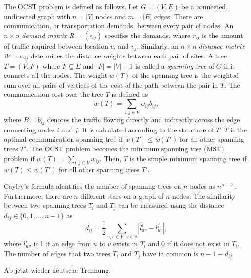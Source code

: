 The OCST problem is defined as follows. Let $G=(V,E)$ be a connected, undirected graph with $n=|V|$ nodes and $m=|E|$ edges. There are  communication, or transportation demands, between every pair of nodes.  An $n \times n$ {\em demand matrix} $R=(r_{ij})$ specifies the demands, where $r_{ij}$ is the amount of traffic required between location $v_i$ and $v_j$. Similarly, an $n\times n$ {\em distance matrix} $W=w_{ij}$ determines the distance weights between each pair of sites. 
A tree $T=(V,F)$ where $F \subseteq E$ and $|F|=|V|-1$ is called a {\em spanning tree} of $G$ if it connects all the nodes. The weight $w(T)$ of the spanning tree is the weighted sum over all pairs of vertices of the cost of the path between the pair in $T$. The communication cost over the tree $T$ is defined as 
\begin{equation}
  \label{equ:1}
w(T)=\sum_{i,j\in V}w_{ij}b_{ij},
\end{equation}
where $B=b_{ij}$ denotes the traffic flowing directly and indirectly across the edge connecting nodes $i$ and $j$. It is calculated according to the structure of $T$. 
$T$ is the optimal communication spanning tree if $w(T)\leq w(T')$ for all other spanning trees $T'$. %
The OCST problem becomes the minimum spanning tree (MST) problem if $w(T)=\sum_{i,j\in V}w_{ij}$. Then, $T$ is the simple minimum spanning tree if $w(T)\leq w(T')$  for all other spanning trees $T'$.%

Cayley's formula identifies the number of spanning trees on $n$ nodes as $n^{n-2}$ \citep{Cayley:89}. Furthermore, there are $n$ different stars on a graph of $n$ nodes. The similarity between two spanning trees $T_i$ and $T_j$ can be measured using the distance   $d_{ij}\in\{0,1,\ldots,n-1\}$ as 
$$
d_{ij}=\frac{1}{2}\sum_{u,v\in V,u<v}|l^{i}_{uv}-l^{j}_{uv}|,
$$
where $l^{i}_{uv}$ is 1 if an edge from $u$ to $v$ exists in $T_i$ and 0 if it does not exist in $T_i$. The number of edges that two trees $T_i$ and $T_j$ have in common is $n-1-d_{ij}$.





Ab jetzt wieder deutsche Trennung.

